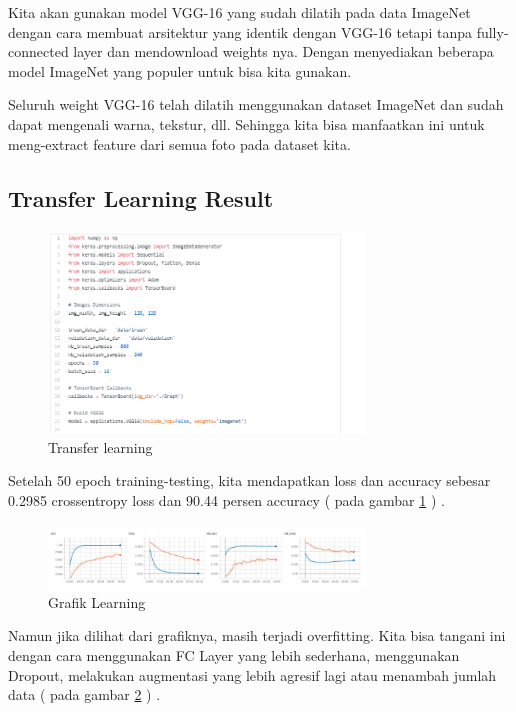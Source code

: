 Kita akan gunakan model VGG-16 yang sudah dilatih pada data ImageNet dengan cara membuat arsitektur yang identik dengan VGG-16 tetapi tanpa fully-connected layer dan mendownload weights nya. Dengan menyediakan beberapa model ImageNet yang populer untuk bisa kita gunakan.

Seluruh weight VGG-16 telah dilatih menggunakan dataset ImageNet dan sudah dapat mengenali warna, tekstur, dll. Sehingga kita bisa manfaatkan ini untuk meng-extract feature dari semua foto pada dataset kita.

\subsection{Transfer Learning Result}

\begin{figure}[!htp]
	\includegraphics[width=0.75\textwidth]{figures/Transfer.PNG}
	\caption{Transfer learning}
	\label{Transfer Learning}
\end{figure}

Setelah 50 epoch training-testing, kita mendapatkan loss dan accuracy sebesar 0.2985 crossentropy loss dan 90.44 persen accuracy ( pada gambar \ref{Transfer Learning} ) .

\begin{figure}[!htp]
	\includegraphics[width=0.75\textwidth]{figures/Grafik.PNG}
	\caption{Grafik Learning}
	\label{Grafik}
\end{figure}

Namun jika dilihat dari grafiknya, masih terjadi overfitting. Kita bisa tangani ini dengan cara menggunakan FC Layer yang lebih sederhana, menggunakan Dropout, melakukan augmentasi yang lebih agresif lagi atau menambah jumlah data ( pada gambar \ref{Grafik} ) .


